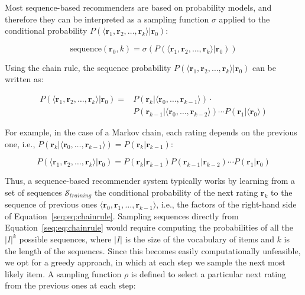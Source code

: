 Most sequence-based recommenders are based on probability models, and therefore they can be interpreted as a sampling function $\sigma$ applied to the conditional probability $P(\langle \mathbf{r}_1, \mathbf{r}_2, \dotsc, \mathbf{r}_k \rangle | \mathbf{r}_0)$:

\begin{equation}
\mathrm{sequence}(\mathbf{r}_0, k) = \sigma (P(\langle \mathbf{r}_1, \mathbf{r}_2, \dotsc, \mathbf{r}_k \rangle | \mathbf{r}_0))
\end{equation}

Using the chain rule, the sequence probability $P(\langle \mathbf{r}_1, \mathbf{r}_2, \dotsc, \mathbf{r}_k \rangle | \mathbf{r}_0)$ can be written as:

\begin{equation}
\label{seq:eq:chainrule}
\begin{split}
P(\langle \mathbf{r}_1, \mathbf{r}_2, \dotsc, \mathbf{r}_k \rangle | \mathbf{r}_0) = & P(\mathbf{r}_k | \langle \mathbf{r}_0, \dotsc, \mathbf{r}_{k - 1} \rangle) \cdot \\ & P(\mathbf{r}_{k - 1} | \langle \mathbf{r}_0, \dotsc, \mathbf{r}_{k - 2} \rangle) \dotsm P(\mathbf{r}_1 | \langle \mathbf{r}_0 \rangle)
\end{split}
\end{equation}

For example, in the case of a Markov chain, each rating depends on the previous one, i.e., $P(\mathbf{r}_k | \langle \mathbf{r}_0, \dotsc, \mathbf{r}_{k - 1} \rangle) =\allowbreak P(\mathbf{r}_k | \mathbf{r}_{k - 1})$:

\begin{equation}
P(\langle \mathbf{r}_1, \mathbf{r}_2, \dotsc, \mathbf{r}_{k} \rangle | \mathbf{r}_0) = P(\mathbf{r}_k | \mathbf{r}_{k - 1}) P(\mathbf{r}_{k - 1} | \mathbf{r}_{k - 2}) \dotsm P(\mathbf{r}_1 | \mathbf{r}_0)
\end{equation}

Thus, a sequence-based recommender system typically works by learning from a set of sequences $\mathcal{S}_{training}$ the conditional probability of the next rating $\mathbf{r}_{k}$ to the sequence of previous ones $\langle \mathbf{r}_0, \mathbf{r}_1 , \dotsc, \mathbf{r}_{k - 1} \rangle$, i.e., the factors of the right-hand side of Equation~\ref{seq:eq:chainrule}.
Sampling sequences directly from Equation~\ref{seq:eq:chainrule} would require computing the probabilities of all the $|I|^k$ possible sequences, where $|I|$ is the size of the vocabulary of items and $k$ is the length of the sequences. Since this becomes easily computationally unfeasible, we opt for a greedy approach, in which at each step we sample the next most likely item. 
A sampling function $\rho$ is defined to select a particular next rating from the previous ones at each step:

